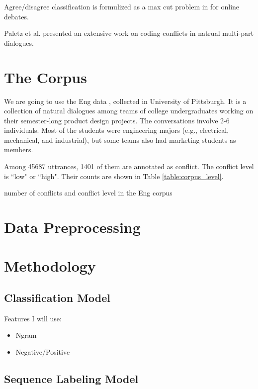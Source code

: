 \documentclass[11pt,letterpaper]{article}
\begin{document}
Agree/disagree classification is formulized as a max cut problem in \cite{Murakami:2010} for online debates.

Paletz et al.  presented an extensive work on coding conflicts in natrual multi-part dialogues.

\section{The Corpus}
We are going to use the Eng data \cite{Jang:2012,Friedberg:2012}, collected in University of Pittsburgh.
It is a collection of natural dialogues among teams of college undergraduates working on their semester-long product design projects.
The conversations involve 2-6 individuals. Most of the students were engineering majors (e.g., electrical, mechanical, and industrial), but some teams also had marketing students as members.

Among 45687 uttrances, 1401 of them are annotated as conflict. The conflict level is ``low" or ``high". Their counts are shown in Table \ref{table:corpus_level}.

\begin{table}
\centering

\caption{number of conflicts and conflict level in the Eng corpus}
\label{table:corpus_level}
\end{table}

\section{Data Preprocessing}

\section{Methodology}

\subsection{Classification Model}
Features I will use:

\begin{itemize}
	\item Ngram
	\item Negative/Positive
\end{itemize}

\subsection{Sequence Labeling Model}
\end{document}
